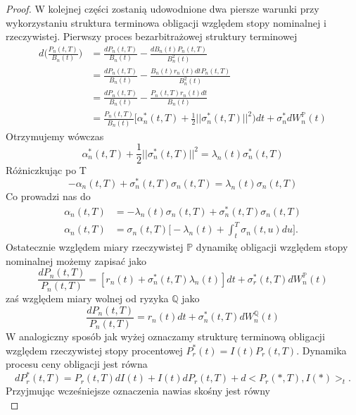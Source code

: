\documentclass{mini}
\theoremstyle{mythstyle}
\begin{document}
\begin{proof}
	W kolejnej części zostanią udowodnione dwa piersze warunki przy wykorzystaniu struktura terminowa obligacji względem stopy nominalnej i rzeczywistej. Pierwszy proces bezarbitrażowej struktury terminowej
	\begin{align*}
	d\bigg(\frac{P_n(t,T)}{B_n(t)}\bigg)  &= \frac{dP_n(t,T)}{B_n(t)} - \frac{dB_n(t)P_n(t,T)}{B_n^2(t)}\\
	&= \frac{dP_n(t,T)}{B_n(t)} - \frac{B_n(t)r_n(t)dt P_n(t,T)}{B_n^2(t)} \\
	&= \frac{dP_n(t,T)}{B_n(t)} - \frac{P_n(t,T) r_n(t)dt }{B_n(t)} \\
	&=\frac{P_n(t,T)}{B_n(t)} \bigg[  \alpha_n^*(t,T) + \frac{1}{2} ||\sigma_n^*(t,T)||^2)dt + \sigma_n^*dW_n^\mathbb{P}(t)
	\end{align*}
	Otrzymujemy wówczas
	\begin{equation}
	\alpha_n^*(t,T) + \frac{1}{2} ||\sigma_n^*(t,T)||^2 = \lambda_n(t)\sigma_n^*(t,T)
	\end{equation}
	Różniczkując po T
	\begin{equation}
	-\alpha_n(t,T) + \sigma_n^*(t,T)\sigma_n(t,T) = \lambda_n(t)\sigma_n(t,T)
	\end{equation}
	Co prowadzi nas do
	\begin{align*}
	\alpha_n(t,T) &= - \lambda_n(t)\sigma_n(t,T) + \sigma_n^*(t,T)\sigma_n(t,T) \\
	\alpha_n(t,T) &= \sigma_n(t,T)\bigg[ -\lambda_n(t) + \int_{t}^{T}\sigma_n(t,u) du\bigg].
	\end{align*}
	Ostatecznie względem miary rzeczywistej $\mathbb{P}$ dynamikę obligacji względem stopy nominalnej możemy zapisać jako
	\begin{equation}
	\frac{dP_n(t,T)}{P_n(t,T)} = [r_n(t) +\sigma^*_n(t,T)\lambda_n(t)]dt + \sigma^*_r(t,T)dW^\mathbb{P}_n(t)
	\end{equation}
	zaś względem miary wolnej od ryzyka $\mathbb{Q}$ jako
	\begin{equation}
	\frac{dP_n(t,T)}{P_n(t,T)} = r_n(t)dt + \sigma^*_n(t,T)dW^\mathbb{Q}_n(t)
	\end{equation}
	W analogiczny sposób jak wyżej oznaczamy strukturę terminową obligacji względem rzeczywistej stopy procentowej $P_r^*(t) = I(t) P_r(t, T)$. Dynamika procesu ceny obligacji jest równa
	\begin{equation}
	d P_r^*(t,T) = P_r(t,T) dI(t) + I(t)dP_r(t,T) + d<P_r(*,T), I(*)>_t.
	\end{equation}
	Przyjmując wcześniejsze oznaczenia nawias skośny jest równy
	\begin{equation*}

\end{equation*}
\end{proof}
\end{document}
